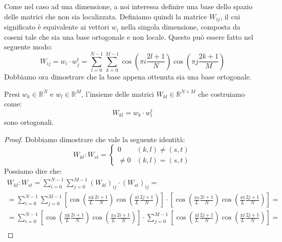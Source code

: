 Come nel caso ad una dimensione, a noi interessa definire una base dello spazio delle
matrici che non sia localizzata. Definiamo quindi la matrice $W_{ij}$, il cui
significato è equivalente ai vettori $w_i$ nella singola dimensione, composta da
coseni tale che sia una base ortogonale e non locale. Questo può essere fatto
nel seguente modo:
\begin{equation}
    W_{ij} = w_i\cdot w_j^t = \sum_{l=0}^{N-1} \sum_{k=0}^{M-1} \cos\left(\pi
    i\frac{2l+1}{N}\right)\cos\left(\pi j\frac{2k+1}{M}\right)
\end{equation}
Dobbiamo ora dimostrare che la base appena ottenuta sia una base ortogonale.
\begin{proposizione}
    Presi $w_k\in \mathbb{R}^N$ e $w_l \in \mathbb{R}^M$, l'insieme delle matrici
    $W_{kl}\in \mathbb{R}^{N\times M}$ che costruiamo come:
    \begin{equation*}
        W_{kl} = w_k\cdot w_l^t
    \end{equation*}
    sono ortogonali.
    \begin{proof}
        Dobbiamo dimostrare che vale la seguente identità:
        \begin{equation*}
            W_{kl} : W_{st} = \begin{cases}
                0      & (k,l)\neq (s,t) \\
                \neq 0 & (k,l)= (s,t)
            \end{cases}
        \end{equation*}
        Possiamo dire che:
        \begin{equation*}
            \begin{array}{l}
                W_{kl} : W_{st} = \sum_{i=0}^{N-1}\sum_{j=0}^{M-1}(W_{kl})_{ij} \cdot (W_{st})_{ij} =                                                                                                                                                                         \\
                = \sum_{i=0}^{N-1}\sum_{j=0}^{M-1}\left[\cos\left(\frac{\pi k}{L}\frac{2i+1}{N}\right)\cos\left(\frac{\pi l}{L}\frac{2j+1}{N}\right)\right] \cdot \left[\cos\left(\frac{\pi s}{L}\frac{2i+1}{N}\right)\cos\left(\frac{\pi t}{L}\frac{2j+1}{N}\right)\right]=  \\
                = \sum_{i=0}^{N-1} \left[\cos\left(\frac{\pi k}{L}\frac{2i+1}{N}\right)\cos\left(\frac{\pi s}{L}\frac{2i+1}{N}\right)\right] \cdot \sum_{j=0}^{M-1}\left[\cos\left(\frac{\pi l}{L}\frac{2j+1}{N}\right)\cos\left(\frac{\pi t}{L}\frac{2j+1}{N}\right)\right]= \\

\end{array}
\end{equation*}
\end{proof}
\end{proposizione}
